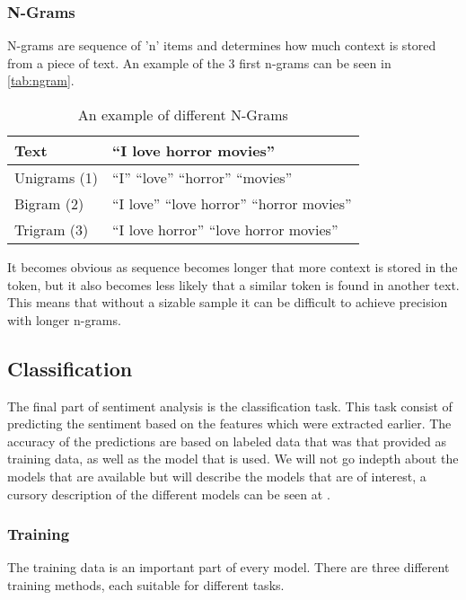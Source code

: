 \subsubsection{N-Grams}
N-grams are sequence of 'n' items and determines how much context is stored
from a piece of text. An example of the 3 first n-grams can be seen in
\autoref{tab:ngram}. 

\begin{table}[H]
\centering
\begin{tabular}{|l|l|}
\hline
Text & ``I love horror movies'' \\ \hline
Unigrams (1) &
``I'' ``love'' ``horror'' ``movies''
\\ \hline 
Bigram (2) &
``I love'' ``love horror'' ``horror movies''
\\ \hline
Trigram (3) &
``I love horror'' ``love horror movies''
\\ \hline
\end{tabular}
\caption{An example of different N-Grams}
\label{tab:ngram}
\end{table}

It becomes obvious as sequence becomes longer that more context is stored in the
token, but it also becomes less likely that a similar token is found in another
text. This means that without a sizable sample it can be difficult to achieve
precision with longer n-grams.

\subsection{Classification}
The final part of sentiment analysis is the classification task. This task
consist of predicting the sentiment based on the features which were extracted
earlier. The accuracy of the predictions are based on labeled data that was that
provided as training data, as well as the model that is used. We will not go
indepth about the models that are available but will describe the models that
are of interest, a cursory description of the different models can be seen at
\citep{Classification}.

\subsubsection{Training}
The training data is an important part of every model. There are three different
training methods, each suitable for different tasks. 

